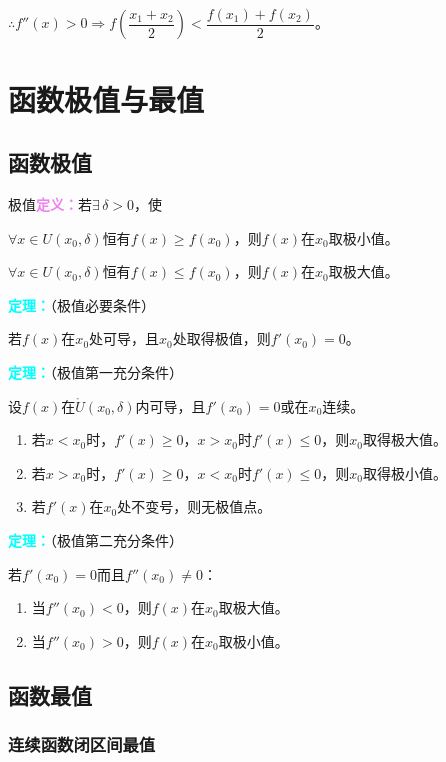 \documentclass[UTF8, 12pt]{ctexart}
\begin{document}
$\therefore f''(x)>0\Rightarrow f(\dfrac{x_1+x_2}{2})<\dfrac{f(x_1)+f(x_2)}{2}$。

\section{函数极值与最值}

\subsection{函数极值}

极值\textcolor{violet}{\textbf{定义：}}若$\exists\,\delta>0$，使

$\forall x\in U(x_0,\delta)$恒有$f(x)\geqslant f(x_0)$，则$f(x)$在$x_0$取极小值。

$\forall x\in U(x_0,\delta)$恒有$f(x)\leqslant f(x_0)$，则$f(x)$在$x_0$取极大值。

\textcolor{aqua}{\textbf{定理：}}（极值必要条件）

若$f(x)$在$x_0$处可导，且$x_0$处取得极值，则$f'(x_0)=0$。

\textcolor{aqua}{\textbf{定理：}}（极值第一充分条件）

设$f(x)$在$\mathring{U}(x_0,\delta)$内可导，且$f'(x_0)=0$或在$x_0$连续。

\begin{enumerate}
    \item 若$x<x_0$时，$f'(x)\geqslant 0$，$x>x_0$时$f'(x)\leqslant 0$，则$x_0$取得极大值。
    \item 若$x>x_0$时，$f'(x)\geqslant 0$，$x<x_0$时$f'(x)\leqslant 0$，则$x_0$取得极小值。
    \item 若$f'(x)$在$x_0$处不变号，则无极值点。
\end{enumerate}

\textcolor{aqua}{\textbf{定理：}}（极值第二充分条件）

若$f'(x_0)=0$而且$f''(x_0)\neq 0$：

\begin{enumerate}
    \item 当$f''(x_0)<0$，则$f(x)$在$x_0$取极大值。
    \item 当$f''(x_0)>0$，则$f(x)$在$x_0$取极小值。
\end{enumerate}

\subsection{函数最值}

\subsubsection{连续函数闭区间最值}
\end{document}
